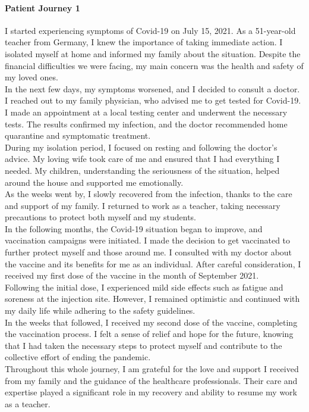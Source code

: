 \paragraph{Patient Journey 1}\label{apx:pj1}
I started experiencing symptoms of Covid-19 on July 15, 2021. As a 51-year-old teacher from Germany, I knew the importance of taking immediate action. I isolated myself at home and informed my family about the situation. Despite the financial difficulties we were facing, my main concern was the health and safety of my loved ones.\\
In the next few days, my symptoms worsened, and I decided to consult a doctor. I reached out to my family physician, who advised me to get tested for Covid-19. I made an appointment at a local testing center and underwent the necessary tests. The results confirmed my infection, and the doctor recommended home quarantine and symptomatic treatment.\\
During my isolation period, I focused on resting and following the doctor's advice. My loving wife took care of me and ensured that I had everything I needed. My children, understanding the seriousness of the situation, helped around the house and supported me emotionally.\\
As the weeks went by, I slowly recovered from the infection, thanks to the care and support of my family. I returned to work as a teacher, taking necessary precautions to protect both myself and my students.\\
In the following months, the Covid-19 situation began to improve, and vaccination campaigns were initiated. I made the decision to get vaccinated to further protect myself and those around me. I consulted with my doctor about the vaccine and its benefits for me as an individual. After careful consideration, I received my first dose of the vaccine in the month of September 2021.\\
Following the initial dose, I experienced mild side effects such as fatigue and soreness at the injection site. However, I remained optimistic and continued with my daily life while adhering to the safety guidelines.\\
In the weeks that followed, I received my second dose of the vaccine, completing the vaccination process. I felt a sense of relief and hope for the future, knowing that I had taken the necessary steps to protect myself and contribute to the collective effort of ending the pandemic.\\
Throughout this whole journey, I am grateful for the love and support I received from my family and the guidance of the healthcare professionals. Their care and expertise played a significant role in my recovery and ability to resume my work as a teacher.
